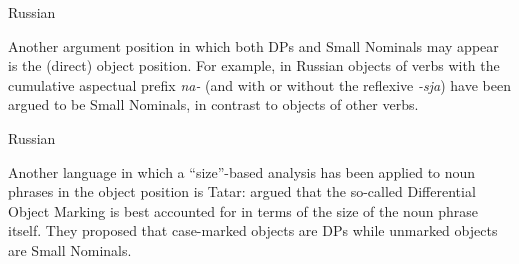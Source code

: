 \documentclass[output=paper]{langsci/langscibook}
\begin{document}
\ea%
    \label{pereex:key:1}
    Russian 
    \z 
\z 


Another argument position in which both DPs and Small Nominals may appear is the (direct) object position. 
For example, in Russian objects of verbs with the cumulative aspectual prefix \textit{na-} (and with or without the reflexive \textit{{}-sja}) 
have been argued to be Small Nominals, in contrast to objects of other verbs.

\ea%
    \label{pereex:key:2}
    Russian 
    \z 
\z

Another language in which a ``size''-based analysis has been applied to noun phrases in the object position is Tatar: 
\citet{LyutikovaPereltsvaig2015} argued that the so-called Differential Object Marking is best accounted for in terms of the size of the noun phrase itself. 
They proposed that case-marked objects are DPs while unmarked objects are Small Nominals. 

\end{document}
